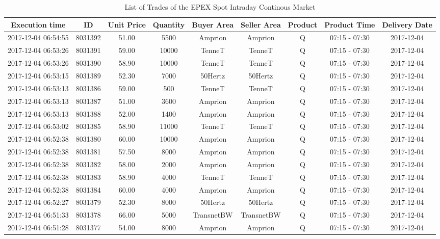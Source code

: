 \documentclass[a4paper, 12pt]{article}
\begin{document}
{\captionsetup[table]{aboveskip=0.5cm}
\begin{table}
\caption{List of Trades of the EPEX Spot Intraday Continous Market \label{table-spot-market}}
\centering
\begin{tabular}{c|cccccccc}
\hline
\hline
Execution time & ID & Unit Price & Quantity & Buyer Area & Seller Area & Product & Product Time & Delivery Date\\
\hline
2017-12-04 06:54:55 & 8031392 & 51.00 & 5500 & Amprion & Amprion & Q & 07:15 - 07:30 & 2017-12-04\\
2017-12-04 06:53:26 & 8031391 & 59.00 & 10000 & TenneT & TenneT & Q & 07:15 - 07:30 & 2017-12-04\\
2017-12-04 06:53:26 & 8031390 & 58.90 & 10000 & TenneT & TenneT & Q & 07:15 - 07:30 & 2017-12-04\\
2017-12-04 06:53:15 & 8031389 & 52.30 & 7000 & 50Hertz & 50Hertz & Q & 07:15 - 07:30 & 2017-12-04\\
2017-12-04 06:53:13 & 8031386 & 59.00 & 500 & TenneT & TenneT & Q & 07:15 - 07:30 & 2017-12-04\\
2017-12-04 06:53:13 & 8031387 & 51.00 & 3600 & Amprion & Amprion & Q & 07:15 - 07:30 & 2017-12-04\\
2017-12-04 06:53:13 & 8031388 & 52.00 & 1400 & Amprion & Amprion & Q & 07:15 - 07:30 & 2017-12-04\\
2017-12-04 06:53:02 & 8031385 & 58.90 & 11000 & TenneT & TenneT & Q & 07:15 - 07:30 & 2017-12-04\\
2017-12-04 06:52:38 & 8031380 & 60.00 & 10000 & Amprion & Amprion & Q & 07:15 - 07:30 & 2017-12-04\\
2017-12-04 06:52:38 & 8031381 & 57.50 & 8000 & Amprion & Amprion & Q & 07:15 - 07:30 & 2017-12-04\\
2017-12-04 06:52:38 & 8031382 & 58.00 & 2000 & Amprion & Amprion & Q & 07:15 - 07:30 & 2017-12-04\\
2017-12-04 06:52:38 & 8031383 & 58.90 & 4000 & TenneT & TenneT & Q & 07:15 - 07:30 & 2017-12-04\\
2017-12-04 06:52:38 & 8031384 & 60.00 & 4000 & Amprion & Amprion & Q & 07:15 - 07:30 & 2017-12-04\\
2017-12-04 06:52:27 & 8031379 & 52.30 & 8000 & 50Hertz & 50Hertz & Q & 07:15 - 07:30 & 2017-12-04\\
2017-12-04 06:51:33 & 8031378 & 66.00 & 5000 & TransnetBW & TransnetBW & Q & 07:15 - 07:30 & 2017-12-04\\
2017-12-04 06:51:28 & 8031377 & 54.00 & 8000 & Amprion & Amprion & Q & 07:15 - 07:30 & 2017-12-04\\

\end{tabular}
\end{table}}
\end{document}
